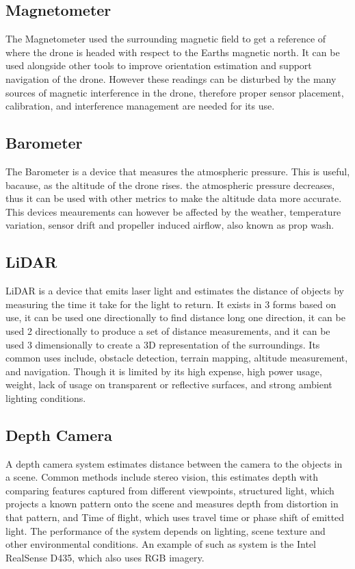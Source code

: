 \documentclass[conference]{IEEEtran}
\begin{document}
\subsection{Magnetometer}
The Magnetometer used the surrounding magnetic field to get a reference of where the drone is headed with respect to the Earths magnetic north. It can be used alongside other tools to improve orientation estimation and support navigation of the drone. However these readings can be disturbed by the many sources of magnetic interference in the drone, therefore proper sensor placement, calibration, and interference management are needed for its use.

\subsection{Barometer}
The Barometer is a device that measures the atmospheric pressure. This is useful, bacause, as the altitude of the drone rises. the atmospheric pressure decreases, thus it can be used with other metrics to make the altitude data more accurate. This devices meaurements can however be affected by the weather, temperature variation, sensor drift and propeller induced airflow, also known as prop wash.

\subsection{LiDAR}
LiDAR is a device that emits laser light and estimates the distance of objects by measuring the time it take for the light to return.
It exists in 3 forms based on use, it can be used one directionally to find distance long one direction, it can be used 2 directionally to produce a set of distance measurements, and it can be used 3 dimensionally to create a 3D representation of the surroundings. Its common uses include, obstacle detection, terrain mapping, altitude measurement, and navigation. Though it is limited by its high expense, high power usage, weight, lack of usage on transparent or reflective surfaces, and strong ambient lighting conditions.

\subsection{Depth Camera}
A depth camera system estimates distance between the camera to the objects in a scene. Common methods include stereo vision, this estimates depth with comparing features captured from different viewpoints, structured light, which projects a known pattern onto the scene and measures depth from distortion in that pattern, and Time of flight, which uses travel time or phase shift of emitted light.
The performance of the system depends on lighting, scene texture and other environmental conditions.
An example of such as system is the Intel RealSense D435, which also uses RGB imagery\cite{realsense}.
\end{document}
